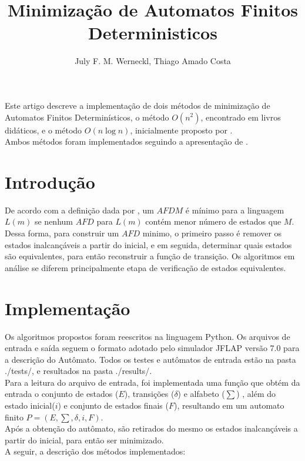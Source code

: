 \documentclass[12pt]{article}
\title{Minimização de Automatos Finitos\\ Deterministicos}
\author{July F. M. Werneckl\inst{1}, Thiago Amado Costa\inst{2} }
\begin{document}
 

\maketitle

     
\begin{resumo} 
Este artigo descreve a implementação de dois métodos de minimização de Automatos Finitos Determinísticos, o método $O(n^2)$, encontrado em livros didáticos, e o método $O(n \log{}n)$, inicialmente proposto por \cite{hopcroft1971n}. \\Ambos métodos foram implementados seguindo a apresentação de \cite{blum1996n}.
\end{resumo}


\section{Introdução}

De acordo com a definição dada por \cite{vieira2006introduccao}, um $AFD M$ é mínimo para a linguagem $L(m)$ se nenhum $AFD$ para $L(m)$ contém menor número de estados que $M$. Dessa forma, para construir um $AFD$ minimo, o primeiro passo é remover os estados inalcançáveis a partir do inicial, e em seguida, determinar quais estados são equivalentes, para então reconstruir a função de transição. Os algoritmos em análise se diferem principalmente etapa de verificação de estados equivalentes. 

\section{Implementação}

Os algoritmos propostos foram reescritos na linguagem Python. Os arquivos de entrada e saída seguem o formato adotado pelo simulador JFLAP versão 7.0 para a descrição do Autômato. Todos os testes e autômatos de entrada estão na pasta ./tests/, e resultados na pasta ./results/.
\\
Para a leitura do arquivo de entrada, foi implementada uma função que obtém da entrada o conjunto de estados ($E$), transições ($\delta$) e alfabeto ($\sum$) , além do estado inicial($i$) e conjunto de estados finais ($F$), resultando em um automato finito $P = (E, \sum, \delta, i ,F )$.
\\
Após a obtenção do autômato, são retirados do mesmo os estados inalcançáveis a partir do inicial, para então ser minimizado.
\\
A seguir, a descrição dos métodos implementados:
\end{document}
